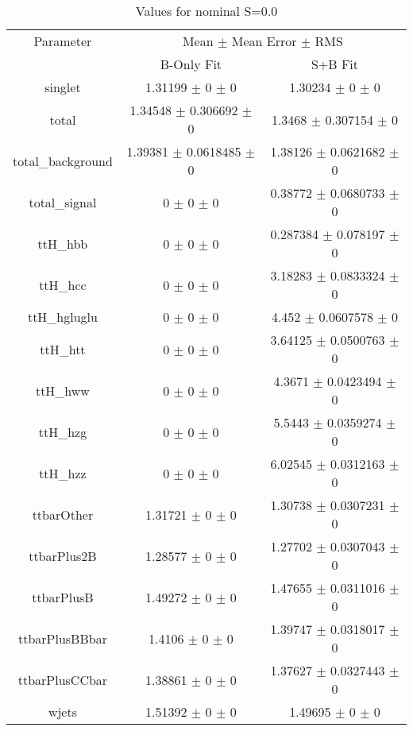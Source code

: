\begin{table}
\centering
\caption{Values for nominal S=0.0}
\begin{tabular}{ccc}
\toprule
Parameter & \multicolumn{2}{c}{Mean $\pm$ Mean Error $\pm$ RMS}\\
 & B-Only Fit & S+B Fit\\
\midrule
singlet & \num{1.31199} $\pm$ \num{0} $\pm$ \num{0} & \num{1.30234} $\pm$ \num{0} $\pm$ \num{0}\\
total & \num{1.34548} $\pm$ \num{0.306692} $\pm$ \num{0} & \num{1.3468} $\pm$ \num{0.307154} $\pm$ \num{0}\\
total\_background & \num{1.39381} $\pm$ \num{0.0618485} $\pm$ \num{0} & \num{1.38126} $\pm$ \num{0.0621682} $\pm$ \num{0}\\
total\_signal & \num{0} $\pm$ \num{0} $\pm$ \num{0} & \num{0.38772} $\pm$ \num{0.0680733} $\pm$ \num{0}\\
ttH\_hbb & \num{0} $\pm$ \num{0} $\pm$ \num{0} & \num{0.287384} $\pm$ \num{0.078197} $\pm$ \num{0}\\
ttH\_hcc & \num{0} $\pm$ \num{0} $\pm$ \num{0} & \num{3.18283} $\pm$ \num{0.0833324} $\pm$ \num{0}\\
ttH\_hgluglu & \num{0} $\pm$ \num{0} $\pm$ \num{0} & \num{4.452} $\pm$ \num{0.0607578} $\pm$ \num{0}\\
ttH\_htt & \num{0} $\pm$ \num{0} $\pm$ \num{0} & \num{3.64125} $\pm$ \num{0.0500763} $\pm$ \num{0}\\
ttH\_hww & \num{0} $\pm$ \num{0} $\pm$ \num{0} & \num{4.3671} $\pm$ \num{0.0423494} $\pm$ \num{0}\\
ttH\_hzg & \num{0} $\pm$ \num{0} $\pm$ \num{0} & \num{5.5443} $\pm$ \num{0.0359274} $\pm$ \num{0}\\
ttH\_hzz & \num{0} $\pm$ \num{0} $\pm$ \num{0} & \num{6.02545} $\pm$ \num{0.0312163} $\pm$ \num{0}\\
ttbarOther & \num{1.31721} $\pm$ \num{0} $\pm$ \num{0} & \num{1.30738} $\pm$ \num{0.0307231} $\pm$ \num{0}\\
ttbarPlus2B & \num{1.28577} $\pm$ \num{0} $\pm$ \num{0} & \num{1.27702} $\pm$ \num{0.0307043} $\pm$ \num{0}\\
ttbarPlusB & \num{1.49272} $\pm$ \num{0} $\pm$ \num{0} & \num{1.47655} $\pm$ \num{0.0311016} $\pm$ \num{0}\\
ttbarPlusBBbar & \num{1.4106} $\pm$ \num{0} $\pm$ \num{0} & \num{1.39747} $\pm$ \num{0.0318017} $\pm$ \num{0}\\
ttbarPlusCCbar & \num{1.38861} $\pm$ \num{0} $\pm$ \num{0} & \num{1.37627} $\pm$ \num{0.0327443} $\pm$ \num{0}\\
wjets & \num{1.51392} $\pm$ \num{0} $\pm$ \num{0} & \num{1.49695} $\pm$ \num{0} $\pm$ \num{0}\\
\bottomrule
\end{tabular}
\end{table}